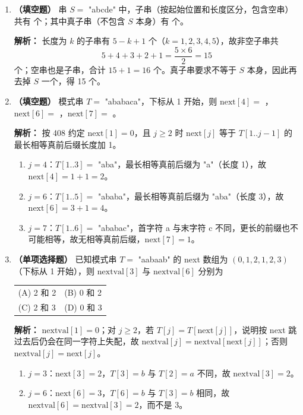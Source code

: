 \begin{enumerate}
\item \textbf{（填空题）} 串 $S=$ "abcde" 中，子串（按起始位置和长度区分，包含空串）共有 \underline{\qquad} 个；其中真子串（不包含 $S$ 本身）有 \underline{\qquad} 个。

\ifshowsolutions\par\noindent\textbf{解析：} 长度为 $k$ 的子串有 $5-k+1$ 个（$k=1,2,3,4,5$），故非空子串共
\[
5+4+3+2+1=\frac{5\times 6}{2}=15
\]
个；空串也是子串，合计 $15+1=16$ 个。真子串要求不等于 $S$ 本身，因此再去掉 $S$ 一个，得 15 个。\else \answerarea \fi

\item \textbf{（填空题）} 模式串 $T=$ "ababaca"，下标从 1 开始，则 $\mathrm{next}[4]=$ \underline{\qquad}，$\mathrm{next}[6]=$ \underline{\qquad}，$\mathrm{next}[7]=$ \underline{\qquad}。

\ifshowsolutions\par\noindent\textbf{解析：} 按 408 约定 $\mathrm{next}[1]=0$，且 $j\geqslant 2$ 时 $\mathrm{next}[j]$ 等于 $T[1..j-1]$ 的最长相等真前后缀长度加 1。
\begin{enumerate}
\item[(1)] $j=4$：$T[1..3]=$ "aba"，最长相等真前后缀为 "a"（长度 1），故 $\mathrm{next}[4]=1+1=2$。
\item[(2)] $j=6$：$T[1..5]=$ "ababa"，最长相等真前后缀为 "aba"（长度 3），故 $\mathrm{next}[6]=3+1=4$。
\item[(3)] $j=7$：$T[1..6]=$ "ababac"，首字符 a 与末字符 c 不同，更长的前缀也不可能相等，故无相等真前后缀，$\mathrm{next}[7]=1$。
\end{enumerate}
\else \answerarea \fi

\item \textbf{（单项选择题）} 已知模式串 $T=$ "aabaab" 的 next 数组为 $(0,1,2,1,2,3)$（下标从 1 开始），则 $\mathrm{nextval}[3]$ 与 $\mathrm{nextval}[6]$ 分别为
\begin{center}
\begin{tabular}{ll}
(A) 2 和 2 & (B) 0 和 2 \\[6pt]
(C) 2 和 3 & (D) 0 和 3
\end{tabular}
\end{center}

\ifshowsolutions\par\noindent\textbf{解析：} $\mathrm{nextval}[1]=0$；对 $j\geqslant 2$，若 $T[j]=T[\mathrm{next}[j]]$，说明按 next 跳过去后仍会在同一字符上失配，故 $\mathrm{nextval}[j]=\mathrm{nextval}[\mathrm{next}[j]]$；否则 $\mathrm{nextval}[j]=\mathrm{next}[j]$。
\begin{enumerate}
\item[(1)] $j=3$：$\mathrm{next}[3]=2$，$T[3]=b$ 与 $T[2]=a$ 不同，故 $\mathrm{nextval}[3]=2$。
\item[(2)] $j=6$：$\mathrm{next}[6]=3$，$T[6]=b$ 与 $T[3]=b$ 相同，故 $\mathrm{nextval}[6]=\mathrm{nextval}[3]=2$，而不是 3。
\end{enumerate}
\else \answerarea \fi


\end{enumerate}
